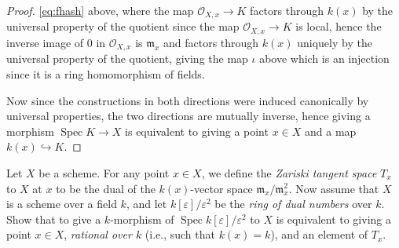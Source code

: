 \documentclass[10pt]{article}
\theoremstyle{definition}
\theoremstyle{remark}
\numberwithin{equation}{section}
\numberwithin{figure}{subsubsection}
\DeclareMathOperator{\Spec}{Spec}
\newcommand{\OO}{\mathcal{O}}
\begin{document}
\begin{proof}
  \eqref{eq:fhash} above, where the map $\OO_{X,x} \to K$ factors through $k(x)$
  by the universal property of the quotient since the map $\OO_{X,x} \to K$ is
  local, hence the inverse image of $\mathfrak{0}$ in $\OO_{X,x}$ is
  $\mathfrak{m}_x$ and factors through $k(x)$ uniquely by the universal property
  of the quotient, giving the map $\iota$ above which is an injection since it
  is a ring homomorphism of fields.
  \par Now since the constructions in both directions were induced canonically by
  universal properties, the two directions are mutually inverse, hence giving a
  morphism $\Spec K \to X$ is equivalent to giving a point $x \in X$ and a map
  $k(x) \hookrightarrow K$.
\end{proof}

\begin{problem}
  Let $X$ be a scheme. For any point $x \in X$, we define the \emph{Zariski tangent space} $T_x$ to $X$ at $x$ to be the dual of the $k(x)$-vector space $\mathfrak{m}_x/\mathfrak{m}_x^2$. Now assume that $X$ is a scheme over a field $k$, and let $k[\varepsilon]/\varepsilon^2$ be the \emph{ring of dual numbers} over $k$. Show that to give a $k$-morphism of $\Spec k[\varepsilon]/\varepsilon^2$ to $X$ is equivalent to giving a point $x \in X$, \emph{rational over $k$} (i.e., such that $k(x) = k$), and an element of $T_x$.
\end{problem}
\end{document}
